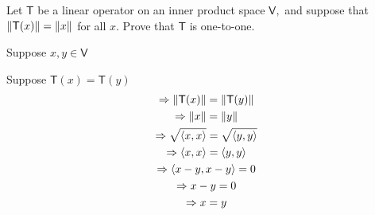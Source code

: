 Let $\mathsf{T}$ be a linear operator on an inner product space
$\mathsf{V},$ and suppose that $\left\lVert\mathsf{T}(x)\right\rVert = \left\lVert x\right\rVert$ for
all $x.$ Prove that $\mathsf{T}$ is one-to-one. 

Suppose $x,y \in \mathsf{V}$

Suppose $\mathsf{T}(x) = \mathsf{T}(y)$
\begin{gather}
\Rightarrow \left\lVert\mathsf{T}(x)\right\rVert = \left\lVert\mathsf{T}(y)\right\rVert\\
\Rightarrow \left\lVert x\right\rVert = \left\lVert y\right\rVert\\
\Rightarrow \sqrt{\langle x,x\rangle} =\sqrt{\langle y,y\rangle}\\
\Rightarrow \langle x,x\rangle = \langle y,y \rangle\\
\Rightarrow \langle x-y,x-y\rangle = 0\\
\Rightarrow x -y = 0\\
\Rightarrow x = y
\end{gather}
